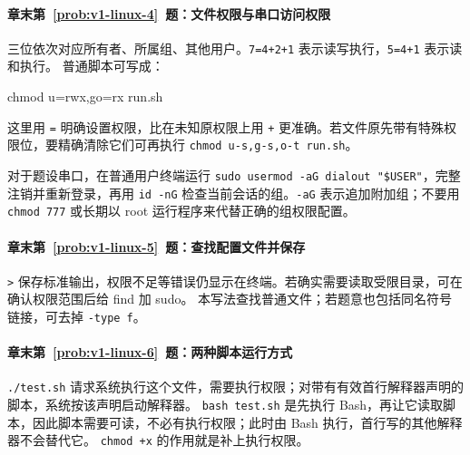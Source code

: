 \paragraph*{章末第~\ref{prob:v1-linux-4}~题：文件权限与串口访问权限}
\begin{solution}
三位依次对应所有者、所属组、其他用户。\texttt{7=4+2+1} 表示读写执行，\texttt{5=4+1} 表示读和执行。
普通脚本可写成：

\begin{tbash}
chmod u=rwx,go=rx run.sh
\end{tbash}

这里用 \texttt{=} 明确设置权限，比在未知原权限上用 \texttt{+} 更准确。若文件原先带有特殊权限位，要精确清除它们可再执行 \texttt{chmod u-s,g-s,o-t run.sh}。

对于题设串口，在普通用户终端运行 \texttt{sudo usermod -aG dialout "\$USER"}，完整注销并重新登录，再用 \texttt{id -nG} 检查当前会话的组。\texttt{-aG} 表示追加附加组；不要用 \texttt{chmod 777} 或长期以 root 运行程序来代替正确的组权限配置。
\end{solution}

\paragraph*{章末第~\ref{prob:v1-linux-5}~题：查找配置文件并保存}
\begin{solution}


\texttt{>} 保存标准输出，权限不足等错误仍显示在终端。若确实需要读取受限目录，可在确认权限范围后给 find 加 sudo。
本写法查找普通文件；若题意也包括同名符号链接，可去掉 \texttt{-type f}。
\end{solution}

\paragraph*{章末第~\ref{prob:v1-linux-6}~题：两种脚本运行方式}
\begin{solution}
\texttt{./test.sh} 请求系统执行这个文件，需要执行权限；对带有有效首行解释器声明的脚本，系统按该声明启动解释器。
\texttt{bash test.sh} 是先执行 Bash，再让它读取脚本，因此脚本需要可读，不必有执行权限；此时由 Bash 执行，首行写的其他解释器不会替代它。
\texttt{chmod +x} 的作用就是补上执行权限。
\end{solution}

